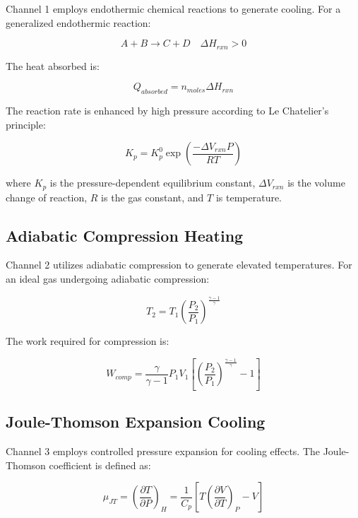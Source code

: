 \documentclass[12pt,a4paper]{article}
\begin{document}
Channel 1 employs endothermic chemical reactions to generate cooling. For a generalized endothermic reaction:

\begin{equation}
A + B \rightarrow C + D \quad \Delta H_{rxn} > 0
\end{equation}

The heat absorbed is:

\begin{equation}
Q_{absorbed} = n_{moles} \Delta H_{rxn}
\end{equation}

The reaction rate is enhanced by high pressure according to Le Chatelier's principle:

\begin{equation}
K_p = K_p^0 \exp\left(\frac{-\Delta V_{rxn} P}{RT}\right)
\end{equation}

where $K_p$ is the pressure-dependent equilibrium constant, $\Delta V_{rxn}$ is the volume change of reaction, $R$ is the gas constant, and $T$ is temperature.

\subsection{Adiabatic Compression Heating}

Channel 2 utilizes adiabatic compression to generate elevated temperatures. For an ideal gas undergoing adiabatic compression:

\begin{equation}
T_2 = T_1 \left(\frac{P_2}{P_1}\right)^{\frac{\gamma-1}{\gamma}}
\end{equation}

The work required for compression is:

\begin{equation}
W_{comp} = \frac{\gamma}{\gamma-1} P_1 V_1 \left[\left(\frac{P_2}{P_1}\right)^{\frac{\gamma-1}{\gamma}} - 1\right]
\end{equation}

\subsection{Joule-Thomson Expansion Cooling}

Channel 3 employs controlled pressure expansion for cooling effects. The Joule-Thomson coefficient is defined as:

\begin{equation}
\mu_{JT} = \left(\frac{\partial T}{\partial P}\right)_H = \frac{1}{C_p}\left[T\left(\frac{\partial V}{\partial T}\right)_P - V\right]
\end{equation}
\end{document}
